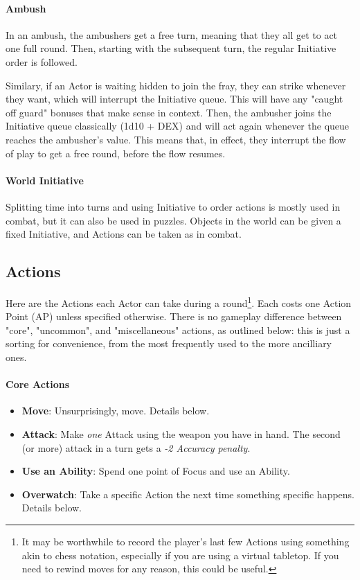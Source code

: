 \paragraph{Ambush}

In an ambush, the ambushers get a free turn, meaning that they all get to act one full round. Then, starting with the subsequent turn, the regular Initiative order is followed.

Similary, if an Actor is waiting hidden to join the fray, they can strike whenever they want, which will interrupt the Initiative queue. This will have any "caught off guard" bonuses that make sense in context. Then, the ambusher joins the Initiative queue classically (1d10 + DEX) and will act again whenever the queue reaches the ambusher's value. This means that, in effect, they interrupt the flow of play to get a free round, before the flow resumes.

\paragraph{World Initiative} 

Splitting time into turns and using Initiative to order actions is mostly used in combat, but it can also be used in puzzles. Objects in the world can be given a fixed Initiative, and Actions can be taken as in combat. 


\subsection{Actions}
\label{actions}

Here are the Actions each Actor can take during a round\footnote{It may be worthwhile to record the player's last few Actions using something akin to chess notation, especially if you are using a virtual tabletop. If you need to rewind moves for any reason, this could be useful.}. Each costs one Action Point (AP) unless specified otherwise. There is no gameplay difference between "core", "uncommon", and "miscellaneous" actions, as outlined below: this is just a sorting for convenience, from the most frequently used to the more ancilliary ones.

\paragraph{Core Actions}
\begin{itemize}
    \item \textbf{Move}: Unsurprisingly, move. Details below.
    \item \textbf{Attack}: Make \textit{one} Attack using the weapon you have in hand. The second (or more) attack in a turn gets a \textit{-2 Accuracy penalty}.
    \item \textbf{Use an Ability}: Spend one point of Focus and use an Ability.
    \item \textbf{Overwatch}: Take a specific Action the next time something specific happens. Details below.
\end{itemize}

